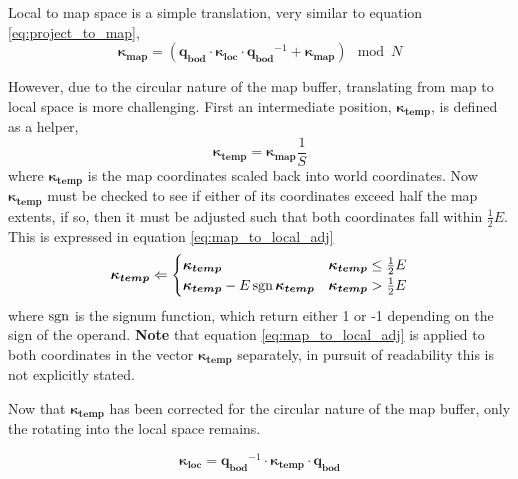         Local to map space is a simple translation, very similar to equation \ref{eq:project_to_map},
        \begin{equation} \label{eq:local_to_map}
            \boldsymbol{\kappa_{map}} = (\boldsymbol{q_{bod}} \cdot \boldsymbol{\kappa_{loc}} \cdot \boldsymbol{q_{bod}}^{-1} + \boldsymbol{\kappa_{map}}) \mod N
        \end{equation}

        However, due to the circular nature of the map buffer, translating from map to local space is more challenging. First an intermediate position, \(\boldsymbol{\kappa_{temp}}\), is defined as a helper,
        \begin{equation} \label{eq:map_to_local_help}
            \boldsymbol{\kappa_{temp}} = \boldsymbol{\kappa_{map}}\frac{1}{S}
        \end{equation}
        where \(\boldsymbol{\kappa_{temp}}\) is the map coordinates scaled back into world coordinates. Now \(\boldsymbol{\kappa_{temp}}\) must be checked to see if either of its coordinates exceed half the map extents, if so, then it must be adjusted such that both coordinates fall within \(\frac{1}{2}E\).
        This is expressed in equation \ref{eq:map_to_local_adj}
        \begin{equation} \label{eq:map_to_local_adj}
            \boldsymbol{\kappa_{temp}} \Leftarrow 
            \begin{cases}
                \boldsymbol{\kappa_{temp}} & \boldsymbol{\kappa_{temp}} \leq \frac{1}{2}E \\
                \boldsymbol{\kappa_{temp}} - E\operatorname{sgn} \boldsymbol{\kappa_{temp}} & \boldsymbol{\kappa_{temp}} > \frac{1}{2}E
            \end{cases}
        \end{equation}
        where \(\operatorname{sgn}\) is the signum function, which return either 1 or -1 depending on the sign of the operand. 
        \textbf{Note} that equation \ref{eq:map_to_local_adj} is applied to both coordinates in the vector \(\boldsymbol{\kappa_{temp}}\) separately, in pursuit of readability this is not explicitly stated.

        Now that \(\boldsymbol{\kappa_{temp}}\) has been corrected for the circular nature of the map buffer, only the rotating into the local space remains.

        \begin{equation} \label{eq:map_to_local_rot}
            \boldsymbol{\kappa_{loc}} = \boldsymbol{q_{bod}}^{-1} \cdot \boldsymbol{\kappa_{temp}} \cdot \boldsymbol{q_{bod}}
        \end{equation}



